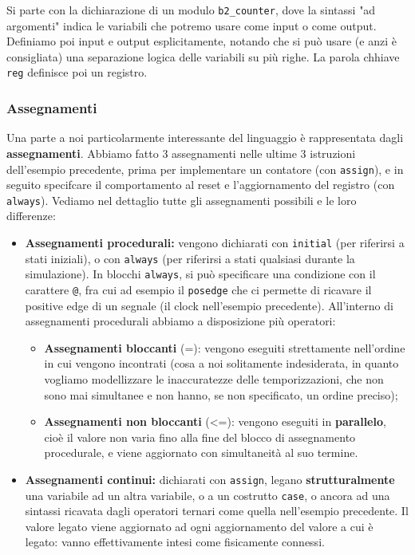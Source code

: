\documentclass[a4paper,11pt]{article}
\begin{document}
Si parte con la dichiarazione di un modulo \lstinline|b2_counter|, dove la sintassi "ad argomenti" indica le variabili che potremo usare come input o come output.
Definiamo poi input e output esplicitamente, notando che si può usare (e anzi è consigliata) una separazione logica delle variabili su più righe.
La parola chhiave \lstinline|reg| definisce poi un registro.

\subsubsection{Assegnamenti}
Una parte a noi particolarmente interessante del linguaggio è rappresentata dagli \textbf{assegnamenti}.
Abbiamo fatto 3 assegnamenti nelle ultime 3 istruzioni dell'esempio precedente, prima per implementare un contatore (con \lstinline|assign|), e in seguito specifcare il comportamento al reset e l'aggiornamento del registro (con \lstinline|always|).
Vediamo nel dettaglio tutte gli assegnamenti possibili e le loro differenze:
\begin{itemize}
	\item \textbf{Assegnamenti procedurali:} vengono dichiarati con \lstinline|initial| (per riferirsi a stati iniziali), o con \lstinline|always| (per riferirsi a stati qualsiasi durante la simulazione).
	In blocchi \lstinline|always|, si può specificare una condizione con il carattere \lstinline|@|, fra cui ad esempio il \lstinline|posedge| che ci permette di ricavare il positive edge di un segnale (il clock nell'esempio precedente).
	All'interno di assegnamenti procedurali abbiamo a disposizione più operatori:
	\begin{itemize}
		\item \textbf{Assegnamenti bloccanti} (=): vengono eseguiti strettamente nell'ordine in cui vengono incontrati (cosa a noi solitamente indesiderata, in quanto vogliamo modellizzare le inaccuratezze delle temporizzazioni, che non sono mai simultanee e non hanno, se non specificato, un ordine preciso);
		\item \textbf{Assegnamenti non bloccanti} (<=): vengono eseguiti in \textbf{parallelo}, cioè il valore non varia fino alla fine del blocco di assegnamento procedurale, e viene aggiornato con simultaneità al suo termine.
	\end{itemize}
\item \textbf{Assegnamenti continui:} dichiarati con \lstinline|assign|, legano \textbf{strutturalmente} una variabile ad un altra variabile, o a un costrutto \lstinline|case|, o ancora ad una sintassi ricavata dagli operatori ternari come quella nell'esempio precedente. Il valore legato viene aggiornato ad ogni aggiornamento del valore a cui è legato: vanno effettivamente intesi come fisicamente connessi.
\end{itemize}
\end{document}
